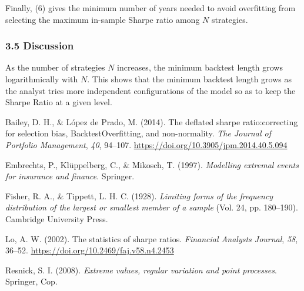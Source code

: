 \documentclass[
  12pt,
]{article}
\newlength{\cslhangindent}
\newenvironment{CSLReferences}[2] %
 {\begin{list}{}{%
  \setlength{\itemindent}{0pt}
  \setlength{\leftmargin}{0pt}
  \setlength{\parsep}{0pt}
  \ifodd #1
   \setlength{\leftmargin}{\cslhangindent}
   \setlength{\itemindent}{-1\cslhangindent}
  \fi
  \setlength{\itemsep}{#2\baselineskip}}}
 {\end{list}}
\begin{document}
Finally, (6) gives the minimum number of years needed to avoid
overfitting from selecting the maximum in-sample Sharpe ratio among
\(N\) strategies.

\subsubsection{3.5 Discussion}\label{discussion}

As the number of strategies \(N\) increases, the minimum backtest length
grows logarithmically with \(N\). This shows that the minimum backtest
length grows as the analyst tries more independent configurations of the
model so as to keep the Sharpe Ratio at a given level.

\newpage

\label{refs}
\begin{CSLReferences}{1}{0}
Bailey, D. H., \& López de Prado, M. (2014). The deflated sharpe
ratio:correcting for selection bias, BacktestOverfitting, and
non-normality. \emph{The Journal of Portfolio Management}, \emph{40},
94--107. \url{https://doi.org/10.3905/jpm.2014.40.5.094}

Embrechts, P., Klüppelberg, C., \& Mikosch, T. (1997). \emph{Modelling
extremal events for insurance and finance}. Springer.

Fisher, R. A., \& Tippett, L. H. C. (1928). \emph{Limiting forms of the
frequency distribution of the largest or smallest member of a sample}
(Vol. 24, pp. 180--190). Cambridge University Press.

Lo, A. W. (2002). The statistics of sharpe ratios. \emph{Financial
Analysts Journal}, \emph{58}, 36--52.
\url{https://doi.org/10.2469/faj.v58.n4.2453}

Resnick, S. I. (2008). \emph{Extreme values, regular variation and point
processes}. Springer, Cop.

\end{CSLReferences}
\end{document}
